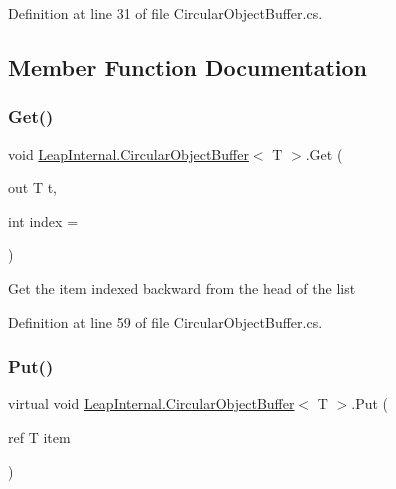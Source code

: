 Definition at line 31 of file Circular\+Object\+Buffer.\+cs.



\subsection{Member Function Documentation}
\mbox{\label{class_leap_internal_1_1_circular_object_buffer_ab16fbaf0f16bf53132679713e636a3c1}} 
\subsubsection{\texorpdfstring{Get()}{Get()}}
{\footnotesize\ttfamily void \mbox{\hyperlink{class_leap_internal_1_1_circular_object_buffer}{Leap\+Internal.\+Circular\+Object\+Buffer}}$<$ T $>$.Get (\begin{DoxyParamCaption}\item[{out T}]{t,  }\item[{int}]{index = {} }\end{DoxyParamCaption})}

Get the item indexed backward from the head of the list 

Definition at line 59 of file Circular\+Object\+Buffer.\+cs.

\mbox{\label{class_leap_internal_1_1_circular_object_buffer_a46ea828b5e827dd3b542eb60bc9f52df}} 
\subsubsection{\texorpdfstring{Put()}{Put()}}
{\footnotesize\ttfamily virtual void \mbox{\hyperlink{class_leap_internal_1_1_circular_object_buffer}{Leap\+Internal.\+Circular\+Object\+Buffer}}$<$ T $>$.Put (\begin{DoxyParamCaption}\item[{ref T}]{item }\end{DoxyParamCaption})\hspace{0.3cm}{\ttfamily [virtual]}}

